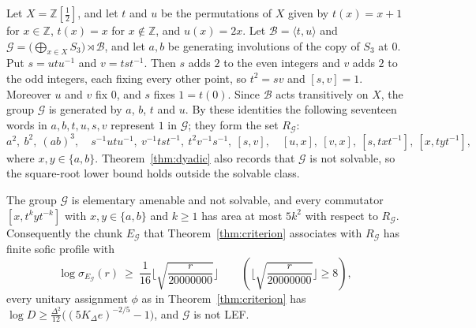 Let $X=\mathbb Z[\frac12]$, and let $t$ and $u$ be the permutations of $X$ given by $t(x)=x+1$ for $x\in\mathbb Z$, $t(x)=x$ for
$x\notin\mathbb Z$, and $u(x)=2x$. Let $\mathcal B=\langle t,u\rangle$ and $\mathcal G=\bigl(\bigoplus_{x\in X}S_3\bigr)\rtimes\mathcal B$, and let $a,b$ be
generating involutions of the copy of $S_3$ at $0$. Put $s=utu^{-1}$ and $v=tst^{-1}$. Then $s$ adds $2$ to the even integers and $v$ adds $2$
to the odd integers, each fixing every other point, so $t^2=sv$ and $[s,v]=1$. Moreover $u$ and $v$ fix $0$, and $s$ fixes $1=t(0)$. Since
$\mathcal B$ acts transitively on $X$, the group $\mathcal G$ is generated by $a$, $b$, $t$ and $u$. By these identities the following seventeen words
in $a,b,t,u,s,v$ represent $1$ in $\mathcal G$; they form the set $R_{\mathcal G}$:
\[
a^2,\ b^2,\ (ab)^3,\quad s^{-1}utu^{-1},\ v^{-1}tst^{-1},\ t^2v^{-1}s^{-1},\ [s,v],\quad [u,x],\ [v,x],\ [s,txt^{-1}],\ [x,tyt^{-1}],
\]
where $x,y\in\{a,b\}$. Theorem~\ref{thm:dyadic} also records that $\mathcal G$ is not solvable, so the square-root lower bound holds outside the
solvable class.

\begin{theorem}\label{thm:dyadic}
The group $\mathcal G$ is elementary amenable and not solvable, and every commutator $[x,t^kyt^{-k}]$ with $x,y\in\{a,b\}$ and
$k\ge1$ has area at most $5k^2$ with respect to $R_{\mathcal G}$. Consequently the chunk $E_{\mathcal G}$ that Theorem~\ref{thm:criterion}
associates with $R_{\mathcal G}$ has finite sofic profile with
\[
\log\sigma_{E_{\mathcal G}}(r)\ \ge\ \frac1{16}\Big\lfloor\sqrt{\frac r{20000000}}\Big\rfloor\qquad\left(\Big\lfloor\sqrt{\frac r{20000000}}\Big\rfloor\ge8\right),
\]
every unitary assignment $\phi$ as in Theorem~\ref{thm:criterion} has $\log D\ge\frac{\Delta^2}{12}\bigl((5K_\Delta e)^{-2/5}-1\bigr)$, and
$\mathcal G$ is not LEF.
\end{theorem}

